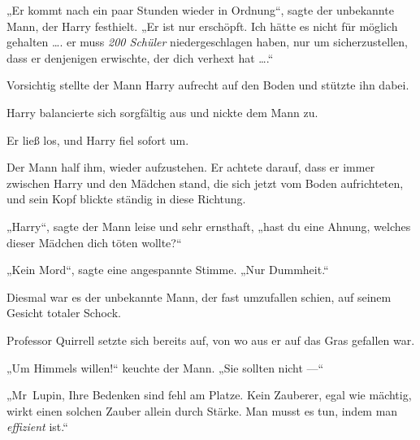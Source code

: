 „Er kommt nach ein paar Stunden wieder in Ordnung“, sagte der unbekannte Mann, der Harry festhielt.
„Er ist nur erschöpft. Ich hätte es nicht für möglich gehalten …. er muss \emph{200 Schüler} niedergeschlagen haben, nur um sicherzustellen, dass er denjenigen erwischte, der dich verhext hat ….“

Vorsichtig stellte der Mann Harry aufrecht auf den Boden und stützte ihn dabei.

Harry balancierte sich sorgfältig aus und nickte dem Mann zu.

Er ließ los, und Harry fiel sofort um.

Der Mann half ihm, wieder aufzustehen. Er achtete darauf, dass er immer zwischen Harry und den Mädchen stand, die sich jetzt vom Boden aufrichteten, und sein Kopf blickte ständig in diese Richtung.

„Harry“, sagte der Mann leise und sehr ernsthaft, „hast du eine Ahnung, welches dieser Mädchen dich töten wollte?“

„Kein Mord“, sagte eine angespannte Stimme.
„Nur Dummheit.“

Diesmal war es der unbekannte Mann, der fast umzufallen schien, auf seinem Gesicht totaler Schock.

Professor Quirrell setzte sich bereits auf, von wo aus er auf das Gras gefallen war.

„Um Himmels willen!“ keuchte der Mann.
„Sie sollten nicht —“

„Mr~Lupin, Ihre Bedenken sind fehl am Platze. Kein Zauberer, egal wie mächtig, wirkt einen solchen Zauber allein durch Stärke. Man musst es tun, indem man \emph{effizient} ist.“

